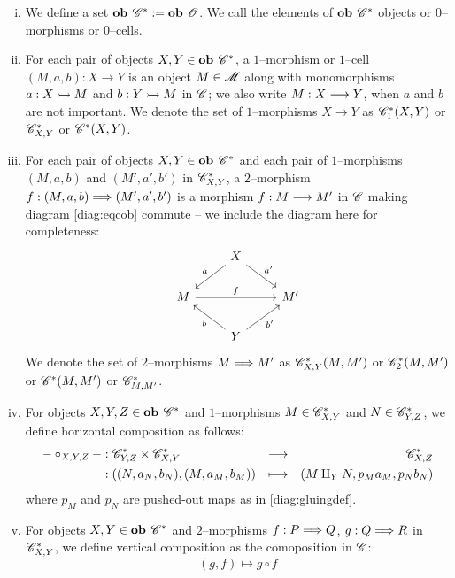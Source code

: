 \documentclass[./Thick_TQFTs_and_Quantum_Information.tex]{subfiles}
\begin{document}
\begin{enumerate}[(i)]

\item We define a set $\textbf{ob } \mathscr{C}^* := \textbf{ob } \mathscr{O}$. We call the elements
of $\textbf{ob } \mathscr{C}^*$ objects or $0$--morphisms or $0$--cells.

\item For each pair of objects $X, Y \in \textbf{ob } \mathscr{C}^*$, a $1$--morphism or
$1$--cell $(M, a, b) : X \to Y$ is an object $M \in \mathscr{M}$ along with
monomorphisms $a : X \stackrel{}{\rightarrowtail} M$ and $b : Y \stackrel{}{\rightarrowtail} M$ in $\mathscr{C}$; we also write
$M : X \stackrel{}{\longrightarrow} Y$, when $a$ and $b$ are not important. We denote the set of
$1$--morphisms $X \to Y$ as $\mathscr{C}^*_1(X, Y)$ or $\mathscr{C}^*_{X, Y}$ or
$\mathscr{C}^*(X, Y)$.

\item For each pair of objects $X, Y \in \textbf{ob } \mathscr{C}^*$ and each pair of
$1$--morphisms $(M, a, b)$ and $(M', a', b')$ in $\mathscr{C}^*_{X, Y}$, a
$2$--morphism $f : (M, a, b) \stackrel{}{\Longrightarrow} (M', a', b')$ is a morphism $f : M \stackrel{}{\longrightarrow} M'$ in
$\mathscr{C}$ making diagram \eqref{diag:eqcob} commute -- we include the diagram here
for completeness:
\[
  \begin{tikzcd}
    & X \arrow[dl, "a" above left] \arrow[dr, "a'" above right] & \\
    M \arrow[rr, "f" above] &
    & M' \\
    & Y \arrow[ul, "b" below left] \arrow[ur, "b'" below right] &
  \end{tikzcd}
\]
We denote the set of
$2$--morphisms $M \stackrel{}{\Longrightarrow} M'$ as $\mathscr{C}^*_{X, Y}(M, M')$ or $\mathscr{C}^*_2(M, M')$ or
$\mathscr{C}^*(M, M')$ or $\mathscr{C}^*_{M, M'}$.

\item For objects $X, Y, Z \in \textbf{ob } \mathscr{C}^*$ and $1$--morphisms
$M \in \mathscr{C}^*_{X, Y}$ and $N \in \mathscr{C}^*_{Y, Z}$, we define horizontal
composition as follows:
\begin{align*}
  - \circ_{X, Y, Z} -
    &: \mathscr{C}^*_{Y, Z} \times \mathscr{C}^*_{X, Y}
    &  \stackrel{}{\longrightarrow}
    &&  \mathscr{C}^*_{X, Z} \\
    &: ((N, a_N, b_N), (M, a_M, b_M))
    &  \longmapsto
    &&  (M \amalg_{Y} N, p_Ma_M, p_Nb_N)
\end{align*}
where $p_M$ and $p_N$ are pushed-out maps as in \eqref{diag:gluingdef}.

\item For objects $X, Y \in \textbf{ob } \mathscr{C}^*$ and $2$--morphisms
$f : P \stackrel{}{\Longrightarrow} Q$, $g : Q \stackrel{}{\Longrightarrow} R$ in $\mathscr{C}^*_{X, Y}$, we define vertical
composition as the comoposition in $\mathscr{C}$:
\[
  (g, f) \mapsto g \circ f
\]

\end{enumerate}
\end{document}
